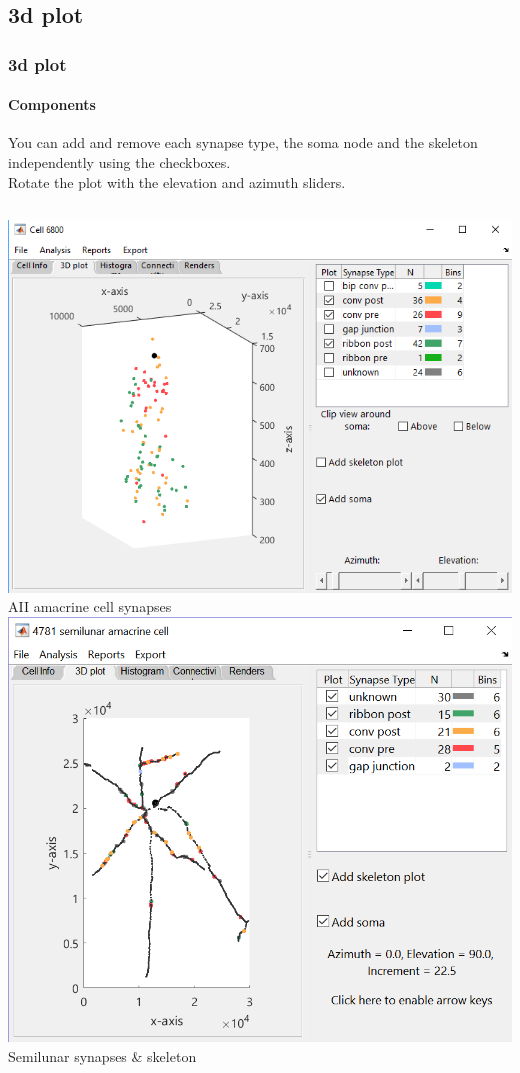 \documentclass[11pt]{beamer}
\begin{document}
\subsection{3d plot}
\begin{frame}
	\frametitle{3d plot}
	\framesubtitle{Components}
		You can add and remove each synapse type, the soma node and the skeleton independently using the checkboxes.\\Rotate the plot with the elevation and azimuth sliders.
		\vskip20pt
		\begin{columns}
				\includegraphics[width=\textwidth]{c6800_plot3}
				\vskip5pt
				AII amacrine cell synapses
				\includegraphics[width=\textwidth]{c4781_plot3}
				\vskip5pt
				Semilunar synapses \& skeleton
		\end{columns}
\end{frame}
\end{document}
